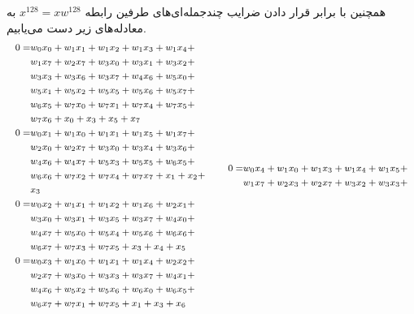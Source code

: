 \endgroup
همچنین با برابر قرار دادن ضرایب چندجمله‌ای‌های طرفین رابطه 
$x^{128} = xw^{128}$
به معادله‌های زیر دست می‌یابیم. 
\begin{equation*}
{\footnotesize \begin{split}
	0 =& w_{0} x_{0} + w_{1} x_{1} + w_{1} x_{2} + w_{1} x_{3} + w_{1} x_{4} +\\
	& w_{1} x_{7} + w_{2} x_{7} + w_{3} x_{0} + w_{3} x_{1} + w_{3} x_{2} +\\
	&w_{3} x_{3} + w_{3} x_{6} + w_{3} x_{7} + w_{4} x_{6} + w_{5} x_{0} +\\
	&w_{5} x_{1} + w_{5} x_{2} + w_{5} x_{5} + w_{5} x_{6} + w_{5} x_{7} +\\
	&w_{6} x_{5} + w_{7} x_{0} + w_{7} x_{1} + w_{7} x_{4} + w_{7} x_{5} +\\
	&w_{7} x_{6} + x_{0} + x_{3} + x_{5} + x_{7}\\
	0 =& w_{0} x_{1} + w_{1} x_{0} + w_{1} x_{1} + w_{1} x_{5} + w_{1} x_{7} +\\
	&w_{2} x_{0} + w_{2} x_{7} + w_{3} x_{0} + w_{3} x_{4} + w_{3} x_{6} +\\
	&w_{4} x_{6} + w_{4} x_{7} + w_{5} x_{3} + w_{5} x_{5} + w_{6} x_{5} +\\
	&w_{6} x_{6} + w_{7} x_{2} + w_{7} x_{4} + w_{7} x_{7} + x_{1} + x_{2} +\\
	&x_{3}\\
	0 =& w_{0} x_{2} + w_{1} x_{1} + w_{1} x_{2} + w_{1} x_{6} + w_{2} x_{1} +\\
	&w_{3} x_{0} + w_{3} x_{1} + w_{3} x_{5} + w_{3} x_{7} + w_{4} x_{0} +\\
	&w_{4} x_{7} + w_{5} x_{0} + w_{5} x_{4} + w_{5} x_{6} + w_{6} x_{6} +\\
	&w_{6} x_{7} + w_{7} x_{3} + w_{7} x_{5} + x_{3} + x_{4} + x_{5}\\
	0 =& w_{0} x_{3} + w_{1} x_{0} + w_{1} x_{1} + w_{1} x_{4} + w_{2} x_{2} +\\
	&w_{2} x_{7} + w_{3} x_{0} + w_{3} x_{3} + w_{3} x_{7} + w_{4} x_{1} +\\
	&w_{4} x_{6} + w_{5} x_{2} + w_{5} x_{6} + w_{6} x_{0} + w_{6} x_{5} +\\
	&w_{6} x_{7} + w_{7} x_{1} + w_{7} x_{5} + x_{1} + x_{3} + x_{6}\\
	\end{split}}
\quad\quad
{\footnotesize\begin{split}
	0 =& w_{0} x_{4} + w_{1} x_{0} + w_{1} x_{3} + w_{1} x_{4} + w_{1} x_{5} +\\
	&w_{1} x_{7} + w_{2} x_{3} + w_{2} x_{7} + w_{3} x_{2} + w_{3} x_{3} +\\

\end{split}}
\end{equation*}
